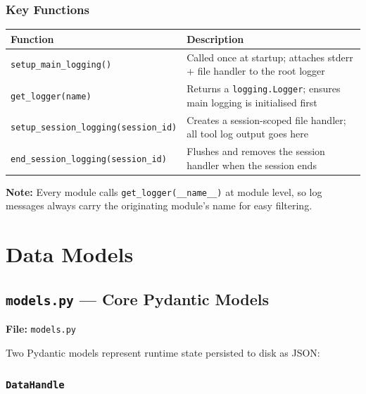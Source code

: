 \documentclass[12pt,a4paper]{report}
\begin{document}
\subsection{Key Functions}

\begin{center}
\begin{tabularx}{\linewidth}{lX}
  \toprule
  \textbf{Function} & \textbf{Description} \\
  \midrule
  \texttt{setup\_main\_logging()} & Called once at startup; attaches stderr + file handler to the root logger \\
  \texttt{get\_logger(name)} & Returns a \texttt{logging.Logger}; ensures main logging is initialised first \\
  \texttt{setup\_session\_logging(session\_id)} & Creates a session-scoped file handler; all tool log output goes here \\
  \texttt{end\_session\_logging(session\_id)} & Flushes and removes the session handler when the session ends \\
  \bottomrule
\end{tabularx}
\end{center}

\begin{mdframed}[style=notebox]
\textbf{Note:} Every module calls \texttt{get\_logger(\_\_name\_\_)} at module level,
so log messages always carry the originating module's name for easy filtering.
\end{mdframed}

\chapter{Data Models}

\section{\texttt{models.py} --- Core Pydantic Models}

\begin{mdframed}[style=filebox]
\textbf{File:} \texttt{models.py}
\end{mdframed}

Two Pydantic models represent runtime state persisted to disk as JSON:

\subsection{\texttt{DataHandle}}
\end{document}
